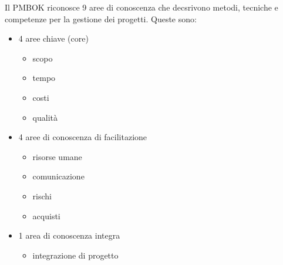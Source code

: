 \documentclass[answers, a4paper, 11pt]{exam}
\begin{document}
Il PMBOK riconosce 9 aree di conoscenza che decsrivono metodi, tecniche e competenze per la gestione dei progetti. Queste sono:

\begin{itemize}
    \item 4 aree chiave (core)
    \begin{itemize}
        \item scopo
        \item tempo
        \item costi
        \item qualità
    \end{itemize}
    \item 4 aree di conoscenza di facilitazione
    \begin{itemize}
        \item risorse umane
        \item comunicazione
        \item rischi
        \item acquisti
    \end{itemize}
    \item 1 area di conoscenza integra
    \begin{itemize}
        \item integrazione di progetto
    \end{itemize}
\end{itemize}
\end{document}

